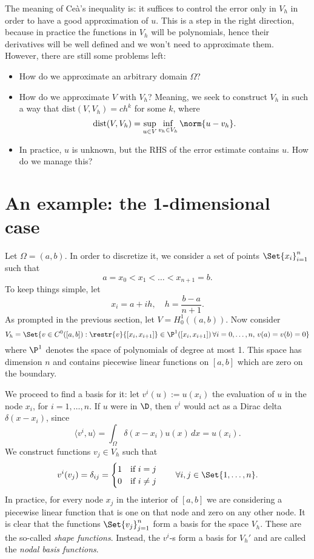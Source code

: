 The meaning of Ceà's inequality is: it suffices to control the error only in $V_h$ in order to have a good approximation of $u$. This is a step in the right direction, because in practice the functions in $V_h$ will be polynomials, hence their derivatives will be well defined and we won't need to approximate them. However, there are still some problems left:
\begin{itemize}
\item How do we approximate an arbitrary domain $\Omega$?
\item How do we approximate $V$ with $V_h$? Meaning, we seek to construct $V_h$ in such a way that $\text{dist}(V,V_h) = c h^k$ for some $k$, where
\[
\text{dist}(V,V_h) = \sup_{u\in V} \inf_{v_h \in V_h} \norm{u - v_h}.
\]
\item In practice, $u$ is unknown, but the RHS of the error estimate contains $u$. How do we manage this?
\end{itemize}



\section{An example: the 1-dimensional case}


Let $\Omega = (a,b)$. In order to discretize it, we consider a set of points $\Set{x_i}_{i=1}^n$ such that
\[
a = x_0 < x_1 < \dots < x_{n+1} = b.
\]
To keep things simple, let
\[
x_i = a+ih, \quad h = \frac{b-a}{n+1}.
\]
As prompted in the previous section, let $V=H_0^1((a,b))$. Now consider
\[
V_h = \Set{v \in C^0([a,b]): \restr{v}{[x_i, x_{i+1}]}\in \P^1([x_i, x_{i+1}]) \,\forall i=0,\dots,n, \, v(a)=v(b)=0}
\]
where $\P^1$ denotes the space of polynomials of degree at most 1. This space has dimension $n$ and contains piecewise linear functions on $[a,b]$ which are zero on the boundary.

We proceed to find a basis for it: let $v^i(u) := u(x_i)$ the evaluation of $u$ in the node $x_i$, for $i=1,\dots,n$. If $u$ were in $\D$, then $v^i$ would act as a Dirac delta $\delta(x-x_i)$, since
\[
\langle v^i, u \rangle = \int_\Omega \delta(x-x_i) u(x) \,dx = u(x_i).
\]
We construct functions $v_j \in V_h$ such that
\[
v^i(v_j) = \delta_{ij} = \begin{cases}
1 \quad \text{if } i=j \\
0 \quad \text{if } i\ne j
\end{cases}
\quad \forall i,j \in \Set{1,\dots,n}.
\]
In practice, for every node $x_j$ in the interior of $[a,b]$ we are considering a piecewise linear function that is one on that node and zero on any other node. It is clear that the functions $\Set{v_j}_{j=1}^{n}$ form a basis for the space $V_h$. These are the so-called \emph{shape functions}. Instead, the $v^i$-s form a basis for $V_h'$ and are called the \emph{nodal basis functions}.

